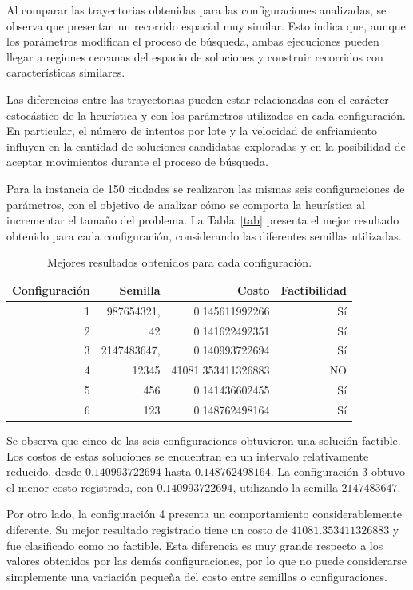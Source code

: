 \documentclass[12pt,a4paper]{article}
\begin{document}
Al comparar las trayectorias obtenidas para las configuraciones analizadas, se observa que presentan un recorrido espacial muy similar. Esto indica que, aunque los parámetros modifican el proceso de búsqueda, ambas ejecuciones pueden llegar a regiones cercanas del espacio de soluciones y construir recorridos con características similares.

Las diferencias entre las trayectorias pueden estar relacionadas con el carácter estocástico de la heurística y con los parámetros utilizados en cada configuración. En particular, el número de intentos por lote y la velocidad de enfriamiento influyen en la cantidad de soluciones candidatas exploradas y en la posibilidad de aceptar movimientos durante el proceso de búsqueda.


Para la instancia de 150 ciudades se realizaron las mismas seis configuraciones de parámetros, con el objetivo de analizar cómo se comporta la heurística al incrementar el tamaño del problema. La Tabla~\ref{tab} presenta el mejor resultado obtenido para cada configuración, considerando las diferentes semillas utilizadas.

\begin{table}[H]
    \centering
    \caption{Mejores resultados obtenidos para cada configuración.}
    \label{tab:resultados}
    \begin{tabular}{rrrr}
        \toprule
        Configuración & Semilla & Costo & Factibilidad  \\
        \midrule
        1 & 987654321, & 0.145611992266 & Sí \\
        2 & 42 & 0.141622492351 & Sí \\
        3 & 2147483647, & 0.140993722694 & Sí \\
        4 & 12345 & 41081.353411326883 & NO \\
        5 & 456 & 0.141436602455 & Sí \\
        6 & 123 & 0.148762498164 & Sí \\
        \bottomrule
    \end{tabular}
\end{table}

Se observa que cinco de las seis configuraciones obtuvieron una solución factible. Los costos de estas soluciones se encuentran en un intervalo relativamente reducido, desde $0.140993722694$ hasta $0.148762498164$. La configuración 3 obtuvo el menor costo registrado, con $0.140993722694$, utilizando la semilla $2147483647$.

Por otro lado, la configuración 4 presenta un comportamiento considerablemente diferente. Su mejor resultado registrado tiene un costo de $41081.353411326883$ y fue clasificado como no factible. Esta diferencia es muy grande respecto a los valores obtenidos por las demás configuraciones, por lo que no puede considerarse simplemente una variación pequeña del costo entre semillas o configuraciones.
\end{document}
